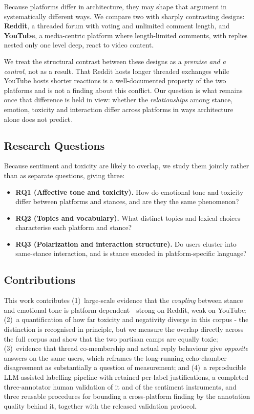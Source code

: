 \documentclass[pdflatex,sn-basic,Numbered,iicol]{sn-jnl}
\begin{document}
Because platforms differ in architecture, they may shape that argument in
systematically different ways. We compare two with sharply contrasting designs:
\textbf{Reddit}, a threaded forum with voting and unlimited comment length, and
\textbf{YouTube}, a media-centric platform where length-limited comments, with replies
nested only one level deep, react to video content.

We treat the structural contrast between these designs as a \emph{premise and a
control}, not as a result. That Reddit hosts longer threaded exchanges while YouTube
hosts shorter reactions is a well-documented property of the two platforms and is
not a finding about this conflict. Our question is what remains once that difference
is held in view: whether the \emph{relationships} among stance, emotion, toxicity and
interaction differ across platforms in ways architecture alone does not predict.

\subsection{Research Questions}
Because sentiment and toxicity are likely to overlap, we study them jointly rather
than as separate questions, giving three:

\begin{itemize}[leftmargin=1.2em,itemsep=1pt,topsep=2pt]
  \item \textbf{RQ1 (Affective tone and toxicity).} How do emotional tone and
  toxicity differ between platforms and stances, and are they the same phenomenon?
  \item \textbf{RQ2 (Topics and vocabulary).} What distinct topics and lexical
  choices characterise each platform and stance?
  \item \textbf{RQ3 (Polarization and interaction structure).} Do users cluster into
  same-stance interaction, and is stance encoded in platform-specific language?
\end{itemize}

\subsection{Contributions}
This work contributes (1)~large-scale evidence that the \emph{coupling} between
stance and emotional tone is platform-dependent - strong on Reddit, weak on
YouTube; (2)~a quantification of how far toxicity and negativity
diverge in this corpus - the distinction is recognised in principle, but we measure
the overlap directly across the full corpus and show that the two partisan camps
are equally toxic; (3)~evidence that thread co-membership and actual reply
behaviour give \emph{opposite} answers on the same users, which reframes the
long-running echo-chamber disagreement as substantially a question of measurement; and (4)~a reproducible LLM-assisted labelling
pipeline with retained per-label justifications, a completed three-annotator human validation of it and of the sentiment instruments, and three reusable procedures for bounding a cross-platform finding by the annotation quality behind it, together with the released validation
protocol.
\end{document}
